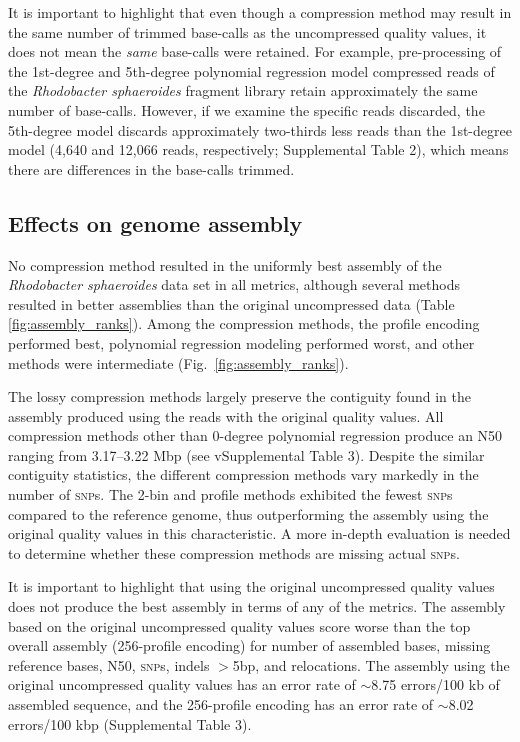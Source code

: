 \documentclass[fleqn,10pt,lineno]{wlpeerj} %
\begin{document}
It is important to highlight that even though a compression method may
result in the same number of trimmed base-calls as the uncompressed
quality values, it does not mean the \emph{same} base-calls were
retained.  For example, pre-processing of the 1st-degree and
5th-degree polynomial regression model compressed reads of the
\textit{Rhodobacter sphaeroides} fragment library retain approximately
the same number of base-calls. However, if we examine the specific
reads discarded, the 5th-degree model discards approximately
two-thirds less reads than the 1st-degree model (4,640 and 12,066
reads, respectively; Supplemental Table 2), which means there are
differences in the base-calls trimmed.

\subsection*{Effects on genome assembly}

No compression method resulted in the uniformly best assembly of the
\textit{Rhodobacter sphaeroides} data set in all metrics, although
several methods resulted in better assemblies than the original
uncompressed data (Table \ref{fig:assembly_ranks}). Among the
compression methods, the profile encoding performed best, polynomial
regression modeling performed worst, and other methods were
intermediate (Fig.~\ref{fig:assembly_ranks}).

The lossy compression methods largely preserve the contiguity found in
the assembly produced using the reads with the original quality
values. All compression methods other than 0-degree polynomial
regression produce an N50 ranging from 3.17--3.22 Mbp (see
vSupplemental Table 3). Despite the similar contiguity statistics, the
different compression methods vary markedly in the number of
\textsc{snp}s. The 2-bin and profile methods exhibited the fewest
\textsc{snp}s compared to the reference genome, thus outperforming the
assembly using the original quality values in this characteristic. A
more in-depth evaluation is needed to determine whether these
compression methods are missing actual \textsc{snp}s.

It is important to highlight that using the original uncompressed
quality values does not produce the best assembly in terms of any of
the metrics. The assembly based on the original uncompressed quality
values score worse than the top overall assembly (256-profile
encoding) for number of assembled bases, missing reference bases, N50,
\textsc{snp}s, indels $>$5bp, and relocations. The assembly using the
original uncompressed quality values has an error rate of $\sim$8.75
errors/100 kb of assembled sequence, and the 256-profile encoding has
an error rate of $\sim$8.02 errors/100 kbp (Supplemental Table 3).
\end{document}
